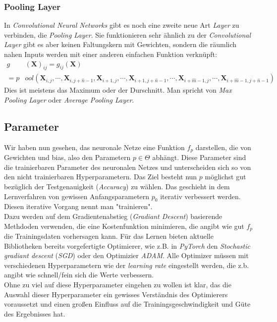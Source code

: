 \documentclass[]{scrartcl}
\begin{document}
		\subsubsection{Pooling Layer}
			In \textit{Convolutional Neural Networks} gibt es noch eine zweite neue Art \textit{Layer} zu verbinden, die \textit{Pooling Layer}.
			Sie funktionieren sehr ähnlich zu der \textit{Convolutional Layer} gibt es aber keinen Faltungskern mit Gewichten, sondern die räumlich nahen Inputs werden mit einer anderen
			einfachen Funktion verknüpft:
			\begin{align*}
				g&(\mathbf{X})_{ij} = g_{ij}(\mathbf{X}) \\
				= p&ool(\mathbf{X}_{i, j}, \cdots, \mathbf{X}_{i, j + \hat{n} - 1}, \mathbf{X}_{i + 1, j}, \cdots, \mathbf{X}_{i + 1, j + \hat{n} - 1},
				   \cdots, \mathbf{X}_{i + \hat{m} - 1, j}, \cdots, \mathbf{X}_{i + \hat{m} - 1, j + \hat{n} - 1})
			\end{align*}
			Dies ist meistens das Maximum oder der Durschnitt. Man spricht von \textit{Max Pooling Layer} oder \textit{Average Pooling Layer}.

	\subsection{Parameter}\label{train}
		Wir haben nun gesehen, das neuronale Netze eine Funktion $f_p$ darstellen, die von Gewichten und bias, also den Parametern $p \in \Theta$ abhängt.
		Diese Parameter sind die trainierbaren Parameter des neuronalen Netzes und unterscheiden sich so von den nicht trainierbaren Hyperparametern.
		Das Ziel besteht nun $p$ möglichst gut bezüglich der Testgenauigkeit (\textit{Accuracy}) zu wählen. Das geschieht in dem Lernverfahren von gewissen Anfangsparametern $p_0$
		iterativ verbessert werden. Diesen iterative Vorgang nennt man "trainieren". \\
		Dazu werden auf dem Gradientenabstieg (\textit{Gradiant Descent}) basierende Methdoden verwenden, die eine Kostenfunktion minimieren,
		die angibt wie gut $f_p$ die Trainingsdaten vorhersagen kann. Für das Lernen bieten aktuelle Bibliotheken bereits vorgefertigte Optimierer, wie z.B.
		in \textit{PyTorch} den \textit{Stochastic gradiant descent} (\textit{SGD}) oder den Optimizier \textit{ADAM}.
		Alle Optimizer müssen mit verschiedenen Hyperparametern wie der \textit{learning rate} eingestellt werden, die z.b. angibt wie schnell/fein sich die Werte verbessern. \\
		Ohne zu viel auf diese Hyperparameter eingehen zu wollen ist klar, das die Auswahl dieser Hyperparameter ein gewisses Verständnis des Optimierers voraussetzt und einen
		großen Einfluss auf die Trainingsgeschwindigkeit und Güte des Ergebnisses hat. \\
\end{document}
